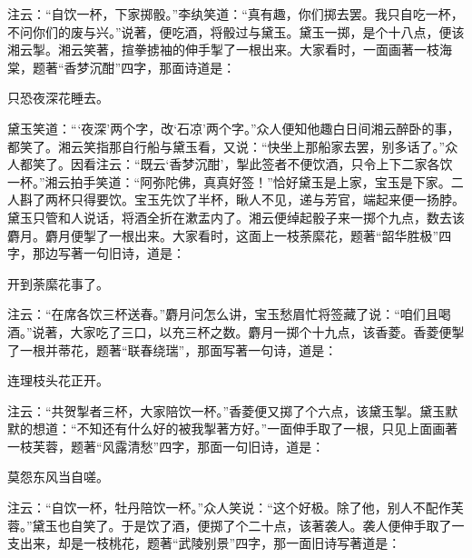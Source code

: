 \begin{parag}
    注云：“自饮一杯，下家掷骰。”李纨笑道：“真有趣，你们掷去罢。我只自吃一杯，不问你们的废与兴。”说著，便吃酒，将骰过与黛玉。黛玉一掷，是个十八点，便该湘云掣。湘云笑著，揎拳掳袖的伸手掣了一根出来。大家看时，一面画著一枝海棠，题著“香梦沉酣”四字，那面诗道是：
\end{parag}
\begin{poem}
    \begin{pl}
        只恐夜深花睡去。
    \end{pl}
\end{poem}

\begin{parag}
    黛玉笑道：“‘夜深’两个字，改‘石凉’两个字。”众人便知他趣白日间湘云醉卧的事，都笑了。湘云笑指那自行船与黛玉看，又说：“快坐上那船家去罢，别多话了。”众人都笑了。因看注云：“既云‘香梦沉酣’，掣此签者不便饮酒，只令上下二家各饮一杯。”湘云拍手笑道：“阿弥陀佛，真真好签！”恰好黛玉是上家，宝玉是下家。二人斟了两杯只得要饮。宝玉先饮了半杯，瞅人不见，递与芳官，端起来便一扬脖。黛玉只管和人说话，将酒全折在漱盂内了。湘云便绰起骰子来一掷个九点，数去该麝月。麝月便掣了一根出来。大家看时，这面上一枝荼縻花，题著“韶华胜极”四字，那边写著一句旧诗，道是：
\end{parag}


\begin{poem}
    \begin{pl}

        开到荼縻花事了。
    \end{pl}
\end{poem}

\begin{parag}
    注云：“在席各饮三杯送春。”麝月问怎么讲，宝玉愁眉忙将签藏了说：“咱们且喝酒。”说著，大家吃了三口，以充三杯之数。麝月一掷个十九点，该香菱。香菱便掣了一根并蒂花，题著“联春绕瑞”，那面写著一句诗，道是：
\end{parag}
\begin{poem}
    \begin{pl}
        连理枝头花正开。
    \end{pl}
\end{poem}

\begin{parag}
    注云：“共贺掣者三杯，大家陪饮一杯。”香菱便又掷了个六点，该黛玉掣。黛玉默默的想道：“不知还有什么好的被我掣著方好。”一面伸手取了一根，只见上面画著一枝芙蓉，题著“风露清愁”四字，那面一句旧诗，道是：
\end{parag}


\begin{poem}
    \begin{pl}
        莫怨东风当自嗟。
    \end{pl}
\end{poem}
\begin{parag}
    注云：“自饮一杯，牡丹陪饮一杯。”众人笑说：“这个好极。除了他，别人不配作芙蓉。”黛玉也自笑了。于是饮了酒，便掷了个二十点，该著袭人。袭人便伸手取了一支出来，却是一枝桃花，题著“武陵别景”四字，那一面旧诗写著道是：
\end{parag}


